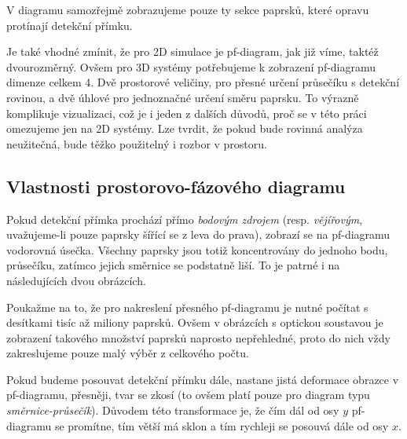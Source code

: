 
V diagramu samozřejmě zobrazujeme pouze ty sekce paprsků, které opravu protínají detekční přímku.

Je také vhodné zmínit, že pro 2D simulace je pf-diagram, jak již víme, taktéž dvourozměrný. Ovšem pro 3D systémy potřebujeme k zobrazení pf-diagramu dimenze celkem 4. Dvě prostorové veličiny, pro přesné určení průsečíku s detekční rovinou, a dvě úhlové pro jednoznačné určení směru paprsku. To výrazně komplikuje vizualizaci, což je i jeden z dalších důvodů, proč se v této práci omezujeme jen na 2D systémy. Lze tvrdit, že pokud bude rovinná analýza neužitečná, bude těžko použitelný i rozbor v prostoru.


\subsection{Vlastnosti prostorovo-fázového diagramu}

Pokud detekční přímka prochází přímo \emph{bodovým zdrojem} (resp. \emph{vějířovým}, uvažujeme-li pouze paprsky šířící se z leva do prava), zobrazí se na pf-diagramu vodorovná úsečka. Všechny paprsky jsou totiž koncentrovány do jednoho bodu, průsečíku, zatímco jejich směrnice se podstatně liší. To je patrné i na následujících dvou obrázcích.

Poukažme na to, že pro nakreslení přesného pf-diagramu je nutné počítat s desítkami tisíc až miliony paprsků. Ovšem v obrázcích s optickou soustavou je zobrazení takového množství paprsků naprosto nepřehledné, proto do nich vždy zakreslujeme pouze malý výběr z celkového počtu.


Pokud budeme posouvat detekční přímku dále, nastane jistá deformace obrazce v pf-diagramu, přesněji, tvar se zkosí (to ovšem platí pouze pro diagram typu \emph{směrnice-průsečík}). Důvodem této transformace je, že čím dál od osy $y$ pf-diagramu se promítne, tím větší má sklon a tím rychleji se posouvá dále od osy $x$. 

